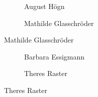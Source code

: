 \begin{figure}
\begin{subfigure}[b]{0.5\linewidth}
\caption{August Högn}
\end{subfigure}
\begin{subfigure}[b]{0.5\linewidth}
\caption{Mathilde Glasschröder}
\end{subfigure}
\end{figure}

\begin{figure}
\begin{subfigure}[b]{0.5\linewidth}
\caption{Barbara Essigmann}
\end{subfigure}
\begin{subfigure}[b]{0.5\linewidth}
\caption{Theres Raster}
\end{subfigure}
\end{figure}
